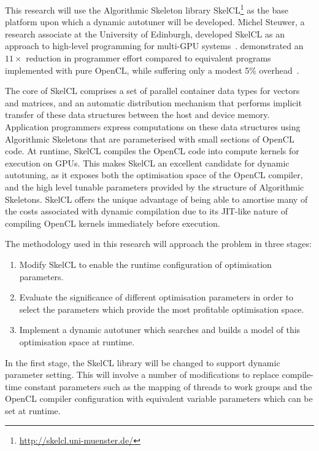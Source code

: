 This research will use the Algorithmic Skeleton library
SkelCL\footnote{\url{http://skelcl.uni-muenster.de/}} as the base
platform upon which a dynamic autotuner will be developed. Michel
Steuwer, a research associate at the University of Edinburgh,
developed SkelCL as an approach to high-level programming for
multi-GPU systems~\cite{Steuwer2011,
Steuwer2013a}. \citeauthor{Steuwer2012} demonstrated an $11\times$
reduction in programmer effort compared to equivalent programs
implemented with pure OpenCL, while suffering only a modest 5\%
overhead~\cite{Steuwer2012}.

The core of SkelCL comprises a set of parallel container data types
for vectors and matrices, and an automatic distribution mechanism that
performs implicit transfer of these data structures between the host
and device memory. Application programmers express computations on
these data structures using Algorithmic Skeletons that are
parameterised with small sections of OpenCL code. At runtime, SkelCL
compiles the OpenCL code into compute kernels for execution on
GPUs. This makes SkelCL an excellent candidate for dynamic autotuning,
as it exposes both the optimisation space of the OpenCL compiler, and
the high level tunable parameters provided by the structure of
Algorithmic Skeletons.
SkelCL offers the unique advantage of being able to amortise many of
the costs associated with dynamic compilation due to its JIT-like
nature of compiling OpenCL kernels immediately before execution.

The methodology used in this research will approach the problem in
three stages:

\begin{enumerate}
\item Modify SkelCL to enable the runtime configuration of
optimisation parameters.
\item Evaluate the significance of different optimisation parameters
in order to select the parameters which provide the most profitable
optimisation space.
\item Implement a dynamic autotuner which searches and builds a model
of this optimisation space at runtime.
\end{enumerate}

In the first stage, the SkelCL library will be changed to support
dynamic parameter setting. This will involve a number of modifications
to replace compile-time constant parameters such as the mapping of
threads to work groups and the OpenCL compiler configuration with
equivalent variable parameters which can be set at runtime.

